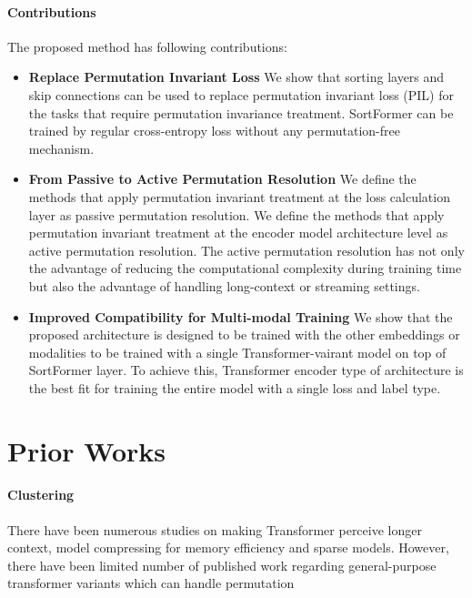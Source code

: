 \documentclass{article}
\begin{document}
\paragraph{Contributions}
The proposed method has following contributions:
\begin{itemize}[leftmargin=*]
  \item \textbf{Replace Permutation Invariant Loss} We show that sorting layers and skip connections can be used to replace permutation invariant loss (PIL) for the tasks 
  that require permutation invariance treatment. SortFormer can be trained by regular cross-entropy loss without any permutation-free mechanism.
  \item \textbf{From Passive to Active Permutation Resolution} We define the methods that apply permutation invariant treatment at the loss calculation 
  layer as passive permutation resolution. We define the methods that apply permutation invariant treatment at the encoder model architecture level as active permutation resolution.
  The active permutation resolution has not only the advantage of reducing the computational complexity during training time but also the advantage of handling long-context or streaming settings.
  \item \textbf{Improved Compatibility for Multi-modal Training} We show that the proposed architecture is designed to be trained with the other embeddings or modalities to be trained with
  a single Transformer-vairant model on top of SortFormer layer. To achieve this, Transformer encoder type of architecture is the best fit for training the entire model with a single loss and label type.
\end{itemize}


\section{Prior Works}

\paragraph{Clustering}
There have been numerous studies on making Transformer perceive longer context, model compressing for memory efficiency and sparse models. However, there have been limited number of
published work regarding general-purpose transformer variants which can handle permutation
\end{document}
